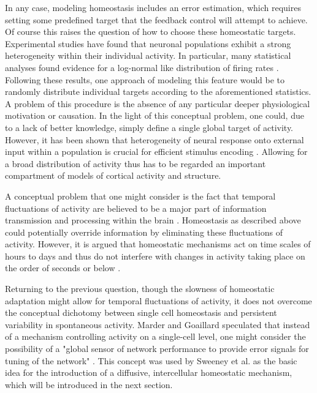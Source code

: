 \documentclass[10pt,a4paper]{article}
\begin{document}
In any case, modeling homeostasis includes an error estimation, which requires setting some predefined target that the feedback control will attempt to achieve. Of course this raises the question of how to choose these homeostatic targets. Experimental studies have found that neuronal populations exhibit a strong heterogeneity within their individual activity. In particular, many statistical analyses found evidence for a log-normal like distribution of firing rates \cite{Buzsaki_Fir_Rates_2014,Wohrer_Fir_Rates_2012}. Following these results, one approach of modeling this feature would be to randomly distribute individual targets according to the aforementioned statistics. A problem of this procedure is the absence of any particular deeper physiological motivation or causation. In the light of this conceptual problem, one could, due to a lack of better knowledge, simply define a single global target of activity. However, it has been shown that heterogeneity of neural response onto external input within a population is crucial for efficient stimulus encoding \cite{Marsat_2010}. Allowing for a broad distribution of activity thus has to be regarded an important compartment of models of cortical activity and structure.

A conceptual problem that one might consider is the fact that temporal fluctuations of activity are believed to be a major part of information transmission and processing within the brain \cite[p. 123-150]{Theor_Neur_Dayan}. Homeostasis as described above could potentially override information by eliminating these fluctuations of activity. However, it is argued that homeostatic mechanisms act on time scales of hours to days and thus do not interfere with changes in activity taking place on the order of seconds or below \cite{Turrigiano_2011}.

Returning to the previous question, though the slowness of homeostatic adaptation might allow for temporal fluctuations of activity, it does not overcome the conceptual dichotomy between single cell homeostasis and persistent variability in spontaneous activity. Marder and Goaillard speculated that instead of a mechanism controlling activity on a single-cell level, one might consider the possibility of a "global sensor of network performance to provide error signals for tuning of the network" \cite{Marder_2006}. This concept was used by Sweeney et al. as the basic idea for the introduction of a diffusive, intercellular homeostatic mechanism, which will be introduced in the next section.
\end{document}
